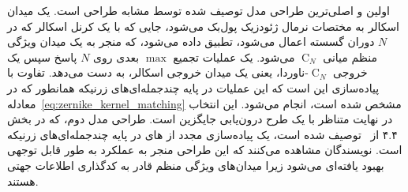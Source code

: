 اولین و اصلی‌ترین طراحی مدل توصیف شده توسط \citet{sun2018zernet} مشابه طراحی \citet{masci2015geodesic} است.
یک میدان اسکالر به مختصات نرمال ژئودزیک پول‌بک می‌شود، جایی که با یک کرنل اسکالر که در $N$ دوران گسسته اعمال می‌شود، تطبیق داده می‌شود، که منجر به یک میدان ویژگی منظم میانی $\operatorname{C}_N$ می‌شود.
یک عملیات تجمیع $\max$ بعدی روی $N$ پاسخ سپس یک خروجی $\operatorname{C}_N$-ناوردا، یعنی یک میدان خروجی اسکالر، به دست می‌دهد.
تفاوت با پیاده‌سازی \citet{masci2015geodesic} این است که این عملیات در پایه چندجمله‌ای‌های زرنیکه همانطور که در معادله~\eqref{eq:zernike_kernel_matching} مشخص شده است، انجام می‌شود.
این انتخاب در نهایت متناظر با یک طرح درون‌یابی جایگزین است.
طراحی مدل دوم، که در بخش ۴.۴ از~\cite{sun2018zernet} توصیف شده است، یک پیاده‌سازی مجدد از های \citet{poulenard2018multi} در پایه چندجمله‌ای‌های زرنیکه است.
نویسندگان مشاهده می‌کنند که این طراحی منجر به عملکرد به طور قابل توجهی بهبود یافته‌ای می‌شود زیرا میدان‌های ویژگی منظم قادر به کدگذاری اطلاعات جهتی هستند.





